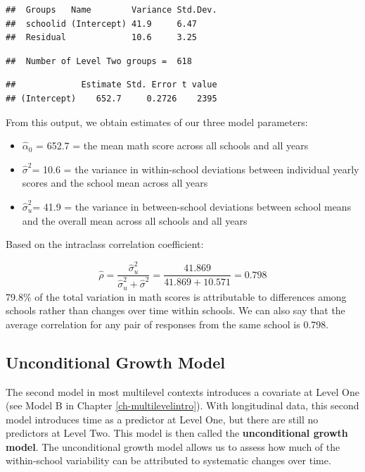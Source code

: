\documentclass[
]{krantz}
\begin{document}
\begin{verbatim}
##  Groups   Name        Variance Std.Dev.
##  schoolid (Intercept) 41.9     6.47    
##  Residual             10.6     3.25
\end{verbatim}

\begin{verbatim}
##  Number of Level Two groups =  618
\end{verbatim}

\begin{verbatim}
##             Estimate Std. Error t value
## (Intercept)    652.7     0.2726    2395
\end{verbatim}

From this output, we obtain estimates of our three model parameters:

\begin{itemize}
\item
  \(\hat{\alpha}_{0}\) = 652.7 = the mean math score across all schools and all years
\item
  \(\hat{\sigma}^2\)= 10.6 = the variance in within-school deviations between individual yearly scores and the school mean across all years
\item
  \(\hat{\sigma}^2_u\)= 41.9 = the variance in between-school deviations between school means and the overall mean across all schools and all years
\end{itemize}

Based on the intraclass correlation coefficient:

\begin{equation*}
\hat{\rho}=\frac{\hat{\sigma}^2_u}{\hat{\sigma}^2_u + \hat{\sigma}^2} = \frac{41.869}{41.869+10.571}= 0.798
\end{equation*}
79.8\% of the total variation in math scores is attributable to differences among schools rather than changes over time within schools. We can also say that the average correlation for any pair of responses from the same school is 0.798.

\subsection{Unconditional Growth Model}\label{modelb9}

The second model in most multilevel contexts introduces a covariate at Level One (see Model B in Chapter \ref{ch-multilevelintro}). With longitudinal data, this second model introduces time as a predictor at Level One, but there are still no predictors at Level Two. This model is then called the \textbf{unconditional growth model}.  The unconditional growth model allows us to assess how much of the within-school variability can be attributed to systematic changes over time.
\end{document}
